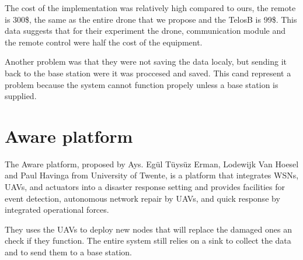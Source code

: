 The cost of the implementation was relatively high compared to ours, the remote is 300\$, the same as the entire drone that we propose and the TelosB is 99\$. This data suggests that for their experiment the drone, communication module and the remote control were half the cost of the equipment.

Another problem was that they were not saving the data localy, but sending it back to the base station were it was proccesed and saved. This cand represent a problem because the system cannot function propely unless a base station is supplied.

\section{Aware platform}

The Aware platform, proposed by Ays. Egül Tüysüz Erman, Lodewijk Van Hoesel and Paul Havinga from
University of Twente, is a platform that integrates WSNs, UAVs, and actuators into a disaster response setting and provides facilities for event detection, autonomous network repair by UAVs, and quick response by integrated operational forces\cite{erman2008enabling}.

They uses the UAVs to deploy new nodes that will replace the damaged ones an check if they function. The entire system still relies on a sink to collect the data and to send them to a base station.





